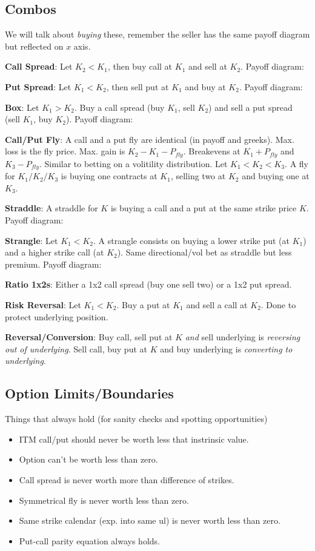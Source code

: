 \documentclass{article}
\begin{document}
\subsection{Combos}
We will talk about \textit{buying} these, remember the seller has the same
payoff diagram but reflected on $x$ axis.

\textbf{Call Spread}: 
Let $K_2 < K_1$, then buy call at $K_1$ and sell at $K_2$. Payoff diagram:

\textbf{Put Spread}: 
Let $K_1 < K_2$, then sell put at $K_1$ and buy at $K_2$. Payoff diagram:

\textbf{Box}: 
Let $K_1 > K_2$. Buy a call spread (buy $K_1$, sell $K_2$)
and sell a put spread (sell $K_1$, buy $K_2$). Payoff diagram:

\textbf{Call/Put Fly}: 
A call and a put fly are identical (in payoff and greeks).
Max. loss is the fly price.
Max. gain is $K_2 - K_1 - P_{fly}$.
Breakevens at $K_1 + P_{fly}$ and $K_3 - P_{fly}$.
Similar to betting on a volitility distribution.
Let $K_1 < K_2 < K_3$. A fly for $K_1/K_2/K_3$ is buying one contracts at $K_1$,
selling two at $K_2$ and buying one at $K_3$.

\textbf{Straddle}: A straddle for $K$ is buying a call and a put at the same
strike price $K$. Payoff diagram:

\textbf{Strangle}: Let $K_1 < K_2$. A strangle consists on buying a lower strike
put (at $K_1$) and a higher strike call (at $K_2$). Same directional/vol bet as
straddle but less premium. Payoff diagram:

\textbf{Ratio 1x2s}: Either a 1x2 call spread (buy one sell two) or a 1x2 put spread.

\textbf{Risk Reversal}: Let $K_1 < K_2$. Buy a put at $K_1$ and sell a call at
$K_2$. Done to protect underlying position.

\textbf{Reversal/Conversion}: Buy call, sell put at $K$ \textit{and} sell
underlying is \textit{reversing out of underlying}. Sell call, buy put at $K$ and buy underlying
is \textit{converting to underlying}.

\subsection{Option Limits/Boundaries}
Things that always hold (for sanity checks and spotting opportunities)
\begin{itemize}
    \item ITM call/put should never be worth less that instrinsic value.
    \item Option can't be worth less than zero.
    \item Call spread is never worth more than difference of strikes.
    \item Symmetrical fly is never worth less than zero.
    \item Same strike calendar (exp. into same ul) is never worth less than
    zero.
    \item Put-call parity equation always holds.
\end{itemize}
\end{document}
